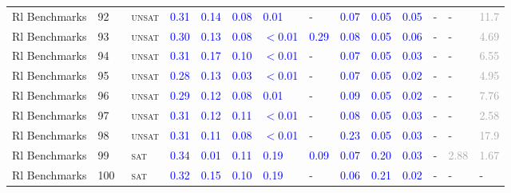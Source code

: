 \begin{center}
{\begin{longtable}{@{}llllllllllllll@{}}
Rl Benchmarks & 92 & ~\textsc{unsat} & \textcolor{blue}{0.31} & \textcolor{blue}{0.14} & \textcolor{blue}{0.08} & \textcolor{blue}{0.01} & - & \textcolor{blue}{0.07} & \textcolor{blue}{0.05} & \textcolor{blue}{0.05} & - & - & \textcolor{darkgray}{11.7} \\
Rl Benchmarks & 93 & ~\textsc{unsat} & \textcolor{blue}{0.30} & \textcolor{blue}{0.13} & \textcolor{blue}{0.08} & \textcolor{blue}{$<$0.01} & \textcolor{blue}{0.29} & \textcolor{blue}{0.08} & \textcolor{blue}{0.05} & \textcolor{blue}{0.06} & - & - & \textcolor{darkgray}{4.69} \\
Rl Benchmarks & 94 & ~\textsc{unsat} & \textcolor{blue}{0.31} & \textcolor{blue}{0.17} & \textcolor{blue}{0.10} & \textcolor{blue}{$<$0.01} & - & \textcolor{blue}{0.07} & \textcolor{blue}{0.05} & \textcolor{blue}{0.03} & - & - & \textcolor{darkgray}{6.55} \\
Rl Benchmarks & 95 & ~\textsc{unsat} & \textcolor{blue}{0.28} & \textcolor{blue}{0.13} & \textcolor{blue}{0.03} & \textcolor{blue}{$<$0.01} & - & \textcolor{blue}{0.07} & \textcolor{blue}{0.05} & \textcolor{blue}{0.02} & - & - & \textcolor{darkgray}{4.95} \\
Rl Benchmarks & 96 & ~\textsc{unsat} & \textcolor{blue}{0.29} & \textcolor{blue}{0.12} & \textcolor{blue}{0.08} & \textcolor{blue}{0.01} & - & \textcolor{blue}{0.09} & \textcolor{blue}{0.05} & \textcolor{blue}{0.02} & - & - & \textcolor{darkgray}{7.76} \\
Rl Benchmarks & 97 & ~\textsc{unsat} & \textcolor{blue}{0.31} & \textcolor{blue}{0.12} & \textcolor{blue}{0.11} & \textcolor{blue}{$<$0.01} & - & \textcolor{blue}{0.08} & \textcolor{blue}{0.05} & \textcolor{blue}{0.03} & - & - & \textcolor{darkgray}{2.58} \\
Rl Benchmarks & 98 & ~\textsc{unsat} & \textcolor{blue}{0.31} & \textcolor{blue}{0.11} & \textcolor{blue}{0.08} & \textcolor{blue}{$<$0.01} & - & \textcolor{blue}{0.23} & \textcolor{blue}{0.05} & \textcolor{blue}{0.03} & - & - & \textcolor{darkgray}{17.9} \\
Rl Benchmarks & 99 & ~\textsc{sat} & \textcolor{blue}{0.34} & \textcolor{blue}{0.01} & \textcolor{blue}{0.11} & \textcolor{blue}{0.19} & \textcolor{blue}{0.09} & \textcolor{blue}{0.07} & \textcolor{blue}{0.20} & \textcolor{blue}{0.03} & - & \textcolor{darkgray}{2.88} & \textcolor{darkgray}{1.67} \\
Rl Benchmarks & 100 & ~\textsc{sat} & \textcolor{blue}{0.32} & \textcolor{blue}{0.15} & \textcolor{blue}{0.10} & \textcolor{blue}{0.19} & - & \textcolor{blue}{0.06} & \textcolor{blue}{0.21} & \textcolor{blue}{0.02} & - & - & - \\

\end{longtable}}
\end{center}
